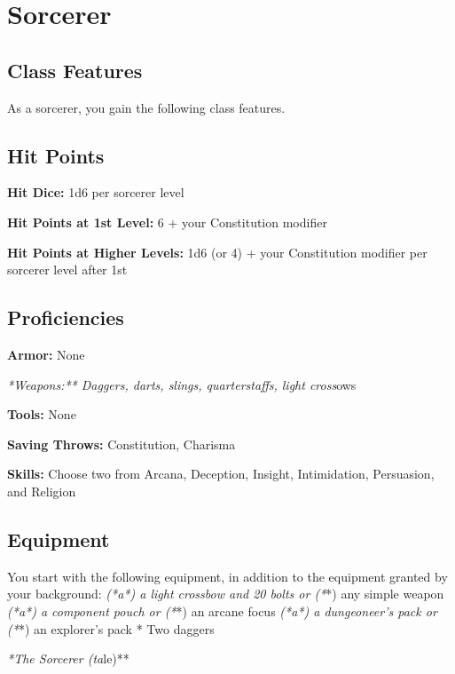 \section{Sorcerer}

\subsection{Class Features}

As a sorcerer, you gain the following class features.

\subsection{Hit Points}

\textbf{Hit Dice:} 1d6 per sorcerer level

\textbf{Hit Points at 1st Level:} 6 + your Constitution modifier

\textbf{Hit Points at Higher Levels:} 1d6 (or 4) + your Constitution modifier per sorcerer level after 1st

\subsection{Proficiencies}

\textbf{Armor:} None

\textit{*Weapons:** Daggers, darts, slings, quarterstaffs, light cross}ows

\textbf{Tools:} None

\textbf{Saving Throws:} Constitution, Charisma

\textbf{Skills:} Choose two from Arcana, Deception, Insight, Intimidation, Persuasion, and Religion

\subsection{Equipment}

You start with the following equipment, in addition to the equipment granted by your background:
\textit{ (*a*) a light crossbow and 20 bolts or (*}*) any simple weapon
\textit{ (*a*) a component pouch or (*}*) an arcane focus
\textit{ (*a*) a dungeoneer’s pack or (*}*) an explorer’s pack
* Two daggers

\textit{*The Sorcerer (ta}le)**

